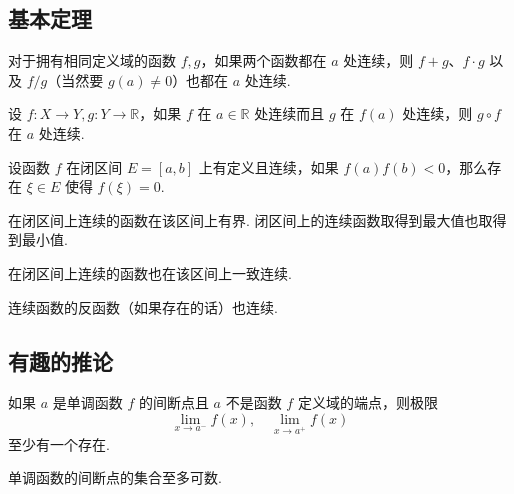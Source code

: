 \subsection{基本定理}
\begin{theorem}
    对于拥有相同定义域的函数 $f,g$，如果两个函数都在 $a$ 处连续，则 $f+g$、$f \cdot g$ 以及 $f/g$（当然要 $g(a) \neq 0$）也都在 $a$ 处连续.
\end{theorem}\vspace{9pt}

\begin{theorem}
    设 $f:X \rightarrow Y, g:Y \rightarrow \mathbb{R}$，如果 $f$ 在 $a \in \mathbb{R}$ 处连续而且 $g$ 在 $f(a)$ 处连续，则 $g \circ f$ 在 $a$ 处连续.
\end{theorem}\vspace{9pt}

\begin{theorem}
    设函数 $f$ 在闭区间 $E = [a,b]$ 上有定义且连续，如果 $f(a)f(b) < 0$，那么存在 $\xi \in E$ 使得 $f(\xi) = 0$.
\end{theorem}\vspace{9pt}

\begin{theorem}
    在闭区间上连续的函数在该区间上有界. 闭区间上的连续函数取得到最大值也取得到最小值.
\end{theorem}\vspace{9pt}

\begin{theorem}
    在闭区间上连续的函数也在该区间上一致连续.
\end{theorem}\vspace{9pt}

\begin{theorem}
    连续函数的反函数（如果存在的话）也连续.
\end{theorem}

\subsection{有趣的推论}
\begin{theorem}
    如果 $a$ 是单调函数 $f$ 的间断点且 $a$ 不是函数 $f$ 定义域的端点，则极限
    \[\lim_{x \rightarrow a^-}f(x), \quad \lim_{x \rightarrow a^+}f(x)\]
    至少有一个存在.
\end{theorem}\vspace{9pt}

\begin{theorem}
    单调函数的间断点的集合至多可数.
\end{theorem}